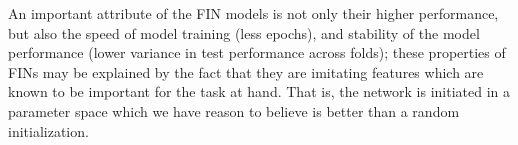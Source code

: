 \documentclass{article}
\begin{document}
An important attribute of the FIN models is not only their higher performance, but also the speed of model training (less epochs), and stability of the model performance (lower variance in test performance across folds); these properties of FINs may be explained by the fact that they are imitating features which are known to be important for the task at hand. That is, the network is initiated in a parameter space which we have reason to believe is better than a random initialization.





\end{document}
